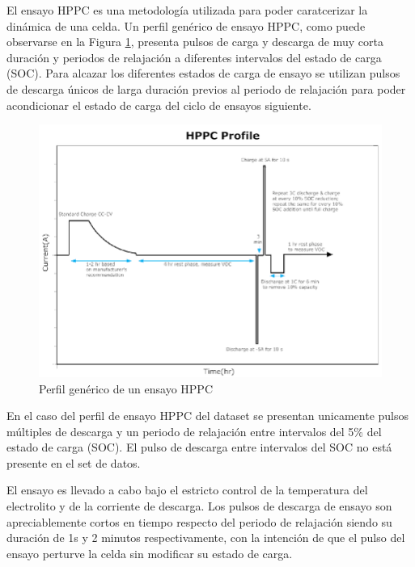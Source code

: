 \documentclass[10pt, a4paper]{report}
\begin{document}
El ensayo \acrshort{HPPC} es una metodología utilizada para poder caratcerizar
la dinámica de una celda. Un perfil genérico de ensayo \acrshort{HPPC}, como
puede observarse en la Figura \ref{fig:gen_HPPC}, presenta
pulsos de carga y descarga de muy corta duración y periodos de relajación a
diferentes intervalos del estado de carga (\acrshort{SOC}). Para alcazar los
diferentes estados de carga de ensayo se utilizan pulsos de descarga únicos de
larga duración previos al periodo de relajación para poder acondicionar el
estado de carga del ciclo de ensayos siguiente.

\begin{figure}[h!]
    \begin{center}
        \includegraphics[width=.6\textwidth]{HPPC-test-profile.png}
        \caption{Perfil genérico de un ensayo HPPC}
        \label{fig:gen_HPPC}
    \end{center}
\end{figure}
\FloatBarrier

En el caso del perfil de ensayo \acrshort{HPPC} del dataset \cite{Kollmeyer2018}
se presentan unicamente pulsos múltiples de descarga y un periodo de relajación
entre intervalos del 5\% del estado de carga (\acrshort{SOC}). El pulso de
descarga entre intervalos del \acrshort{SOC} no está presente en el set de
datos.

El ensayo es llevado a cabo bajo el estricto control de la temperatura del
electrolito y de la corriente de descarga. Los pulsos de descarga de ensayo son
apreciablemente cortos en tiempo respecto del periodo de relajación siendo su
duración de 1s y 2 minutos respectivamente, con la intención de que el pulso del
ensayo perturve la celda sin modificar su estado de carga.
\end{document}
